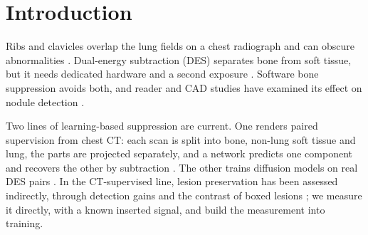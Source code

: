 \section{Introduction}
\label{sec:intro}
Ribs and clavicles overlap the lung fields on a chest radiograph and can obscure abnormalities \citep{angaitkar2026anatomy}.
Dual-energy subtraction (DES) separates bone from soft tissue, but it needs dedicated hardware and a second exposure
\citep{kuhlman2006des,sun2026bsldm,sun2026debonedit}. Software bone suppression avoids both, and reader and CAD studies have examined its effect on nodule
detection \citep{freedman2011lung,schalekamp2014cad}.

Two lines of learning-based suppression are current. One renders paired supervision from chest CT: each scan is split into bone, non-lung
soft tissue and lung, the parts are projected separately, and a network predicts one component and recovers the other by subtraction
\citep{angaitkar2026anatomy}. The other trains diffusion models on real DES pairs
\citep{chen2024bsdiff,sun2026bsldm,sun2025gllcm,sun2026debonedit}. In the CT-supervised line, lesion preservation has been assessed indirectly,
through detection gains and the contrast of boxed lesions \citep{angaitkar2026anatomy}; we measure it directly, with a known inserted signal, and
build the measurement into training.

